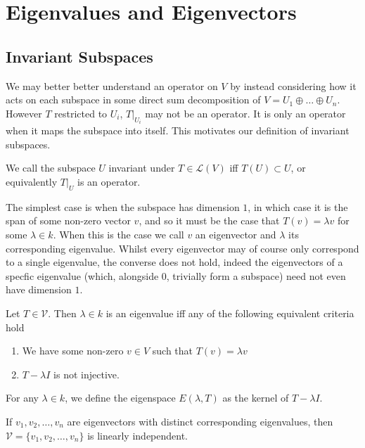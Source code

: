 \documentclass[]{article}
\begin{document}
\section{Eigenvalues and Eigenvectors}

\subsection{Invariant Subspaces}

We may better better understand an operator on $V$ by instead considering how it acts on each subspace in some direct sum decomposition of $V = U_1 \oplus \ldots \oplus U_n$. However $T$ restricted to $U_i$, $T|_{U_i}$ may not be an operator. It is only an operator when it maps the subspace into itself. This motivates our definition of invariant subspaces.

\begin{defi} 
		We call the subspace $U$ invariant under $T \in \mathcal{L}(V)$ iff $T(U) \subset U$, or equivalently $T|_U$ is an operator.
\end{defi}

The simplest case is when the subspace has dimension $1$, in which case it is the span of some non-zero vector $v$, and so it must be the case that $T(v) = \lambda v$ for some $\lambda \in k$. When this is the case we call $v$ an eigenvector and $\lambda$ its corresponding eigenvalue. Whilst every eigenvector may of course only correspond to a single eigenvalue, the converse does not hold, indeed the eigenvectors of a specfic eigenvalue (which, alongside $0$, trivially form a subspace) need not even have dimension $1$.

\begin{defi}
		Let $T \in \mathcal{V}$. Then $\lambda \in k$ is an eigenvalue iff any of the following equivalent criteria hold
		\begin{enumerate}
				\item We have some non-zero $v \in V$ such that $T(v) = \lambda v$ 
				\item $T - \lambda I$ is not injective.
		\end{enumerate}

		For any $\lambda \in k$, we define the eigenspace $E(\lambda, T)$ as the kernel of $T - \lambda I$. 
\end{defi}

\begin{thm}
		If $v_1, v_2, \ldots, v_n$ are eigenvectors with distinct corresponding eigenvalues, then $\mathcal{V} = \{v_1, v_2, \ldots, v_n\}$ is linearly independent.
\end{thm}
\end{document}
